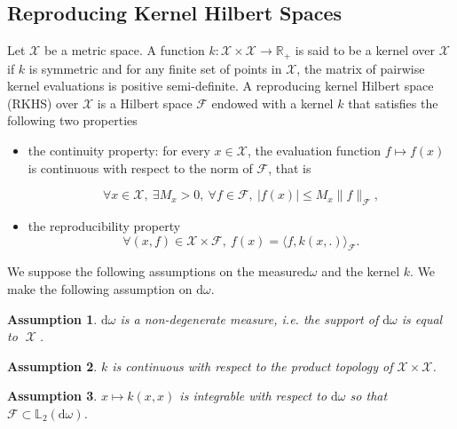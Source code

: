 \documentclass[twoside,11pt]{book}
\newtheorem{assumption}{Assumption}
\numberwithin{theorem}{chapter}
\numberwithin{definition}{chapter}
\numberwithin{proposition}{chapter}
\numberwithin{corollary}{chapter}
\numberwithin{example}{chapter}
\numberwithin{lemma}{chapter}
\numberwithin{assumption}{chapter}
\DeclareMathOperator{\X}{\mathcal{X}}
\begin{document}
\subsection{Reproducing Kernel Hilbert Spaces}\label{subsec:rkhs}
Let $\mathcal{X}$ be a metric space. A function $k: \mathcal{X} \times \mathcal{X} \rightarrow \mathbb{R}_{+}$ is said to be a kernel over $\mathcal{X}$ if $k$ is symmetric and for any finite set of points in $\mathcal{X}$, the matrix of pairwise kernel evaluations is positive semi-definite. A reproducing kernel Hilbert space (RKHS) over $\mathcal{X}$ is a Hilbert space $\mathcal{F}$ endowed with a kernel $k$ that satisfies the following two properties \cite{BeTh11}
\begin{itemize}
\item the continuity property: for every $x \in \mathcal{X}$, the evaluation function $f \mapsto f(x)$ is continuous with respect to the norm of $\mathcal{F}$, that is

\begin{equation}
\forall x \in \mathcal{X}, \: \exists M_{x} >0 , \: \forall f \in \mathcal{F}, \: |f(x)| \leq M_{x} \|f\|_{\mathcal{F}},\nonumber
\end{equation} 
\item the reproducibility property\begin{equation}
\forall (x,f) \in \mathcal{X}\times\mathcal{F}, \: f(x) = \langle f, k(x,.) \rangle_{\mathcal{F}}. \nonumber
\end{equation}
\end{itemize}
We suppose the following assumptions on the measure$\mathrm{d}\omega$ and the kernel $k$.
We make the following assumption on $\mathrm{d}\omega$.
\begin{assumption}\label{hyp:domega_is_nondegenerate}
$\mathrm{d}\omega$ is a \emph{non-degenerate} measure, i.e. the support of $\mathrm{d}\omega$ is equal to $\X$.
\end{assumption}

\begin{assumption}\label{hyp:k_is_continuous}
$k$ is continuous with respect to the product topology of $\mathcal{X} \times \mathcal{X}$.
\end{assumption}

\begin{assumption}\label{hyp:the_diagonal_k_is_integrable}
$x \mapsto k(x,x)$ is integrable with respect to $\mathrm{d}\omega$ so that $\mathcal{F} \subset \mathbb{L}_{2}(\mathrm{d}\omega)$.
\end{assumption}
\end{document}

